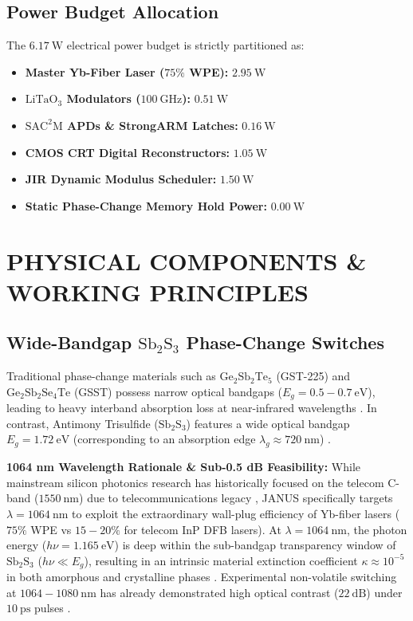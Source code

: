 \documentclass[journal]{IEEEtran}
\begin{document}
\subsection{Power Budget Allocation}
The $6.17~\mathrm{W}$ electrical power budget is strictly partitioned as:
\begin{itemize}
    \item \textbf{Master Yb-Fiber Laser ($75\%$ WPE):} $2.95~\mathrm{W}$
    \item \textbf{$\mathrm{LiTaO_3}$ Modulators ($100~\mathrm{GHz}$):} $0.51~\mathrm{W}$
    \item \textbf{$\mathrm{SAC^2M}$ APDs \& StrongARM Latches:} $0.16~\mathrm{W}$
    \item \textbf{CMOS CRT Digital Reconstructors:} $1.05~\mathrm{W}$
    \item \textbf{JIR Dynamic Modulus Scheduler:} $1.50~\mathrm{W}$
    \item \textbf{Static Phase-Change Memory Hold Power:} $\mathbf{0.00~\mathrm{W}}$
\end{itemize}

\section{PHYSICAL COMPONENTS \& WORKING PRINCIPLES}

\subsection{Wide-Bandgap \texorpdfstring{$\mathrm{Sb_2S_3}$}{Sb2S3} Phase-Change Switches}
Traditional phase-change materials such as $\mathrm{Ge_2Sb_2Te_5}$ (GST-225) and $\mathrm{Ge_2Sb_2Se_4Te}$ (GSST) possess narrow optical bandgaps ($E_g = 0.5 - 0.7~\mathrm{eV}$), leading to heavy interband absorption loss at near-infrared wavelengths \cite{Wuttig2017}\cite{Fang2022}. In contrast, Antimony Trisulfide ($\mathrm{Sb_2S_3}$) features a wide optical bandgap $E_g = 1.72~\mathrm{eV}$ (corresponding to an absorption edge $\lambda_g \approx 720~\mathrm{nm}$) \cite{Dong2022}\cite{Delaney2020}. 

\textbf{1064 nm Wavelength Rationale \& Sub-0.5 dB Feasibility:} While mainstream silicon photonics research has historically focused on the telecom C-band ($1550~\mathrm{nm}$) due to telecommunications legacy \cite{Zhou2024}\cite{Bao2025}, JANUS specifically targets $\lambda = 1064~\mathrm{nm}$ to exploit the extraordinary wall-plug efficiency of Yb-fiber lasers ($75\%$ WPE vs $15-20\%$ for telecom InP DFB lasers). At $\lambda = 1064~\mathrm{nm}$, the photon energy ($h\nu = 1.165~\mathrm{eV}$) is deep within the sub-bandgap transparency window of $\mathrm{Sb_2S_3}$ ($h\nu \ll E_g$), resulting in an intrinsic material extinction coefficient $\kappa \approx 10^{-5}$ in both amorphous and crystalline phases \cite{Delaney2020}\cite{Zhang2023MDM}. Experimental non-volatile switching at $1064-1080~\mathrm{nm}$ has already demonstrated high optical contrast ($22~\mathrm{dB}$) under $10~\mathrm{ps}$ pulses \cite{PerezFrances2023}. 
\end{document}
